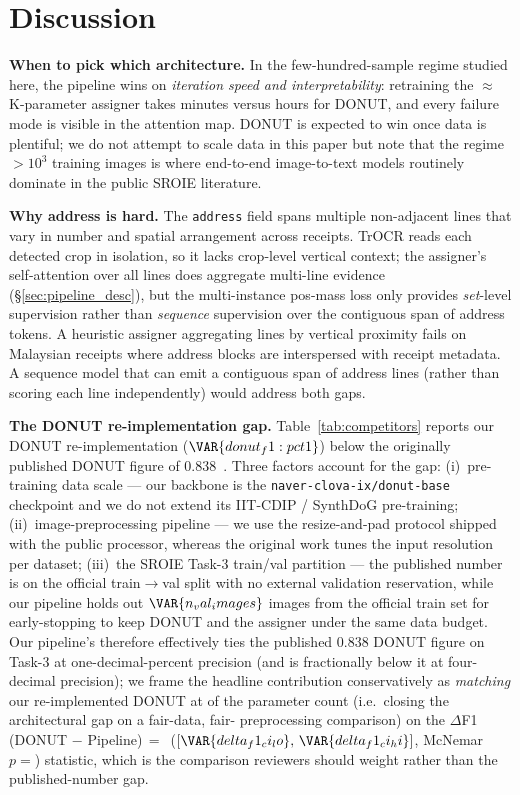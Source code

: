 \section{Discussion}
\label{sec:discussion}

\textbf{When to pick which architecture.}
In the few-hundred-sample regime studied here, the pipeline wins on
\emph{iteration speed and interpretability}: retraining the
$\approx$\,K-parameter assigner takes minutes
versus hours for DONUT, and every failure mode is visible in the
attention map.  DONUT is expected to win once data is plentiful; we
do not attempt to scale data in this paper but note that the regime
$>10^3$ training images is where end-to-end image-to-text models
routinely dominate in the public SROIE literature.

\textbf{Why address is hard.}
The \texttt{address} field spans multiple non-adjacent lines that
vary in number and spatial arrangement across receipts.  TrOCR reads
each detected crop in isolation, so it lacks crop-level vertical
context; the assigner's self-attention over all lines does aggregate
multi-line evidence (\S\ref{sec:pipeline_desc}), but the
multi-instance pos-mass loss only provides \emph{set}-level
supervision rather than \emph{sequence} supervision over the
contiguous span of address tokens.  A heuristic assigner aggregating
lines by vertical proximity fails on Malaysian receipts where address
blocks are interspersed with receipt metadata.  A sequence model that
can emit a contiguous span of address lines (rather than scoring
each line independently) would address both gaps.

\textbf{The DONUT re-implementation gap.}
Table~\ref{tab:competitors} reports our DONUT re-implementation
($\VAR{donut_f1:pct1}$) below the originally published DONUT figure
of $0.838$~\cite{kim2022donut}.  Three factors account for the gap:
(i)~pre-training data scale --- our backbone is the
\texttt{naver-clova-ix/donut-base} checkpoint and we do not extend
its IIT-CDIP / SynthDoG pre-training; (ii)~image-preprocessing
pipeline --- we use the resize-and-pad protocol shipped with the
public processor, whereas the original work tunes the input
resolution per dataset; (iii)~the SROIE Task-3 train/val partition
--- the published number is on the official train$\rightarrow$val
split with no external validation reservation, while our pipeline
holds out $\VAR{n_val_images}$ images from the official train set for early-stopping
to keep DONUT and the assigner under the same data budget.  Our
pipeline's  therefore effectively ties the
published $0.838$ DONUT figure on Task-3 at one-decimal-percent
precision (and is fractionally below it at four-decimal precision);
we frame the headline contribution conservatively as \emph{matching}
our re-implemented DONUT at  of the
parameter count
(i.e.\ closing the architectural gap on a fair-data, fair-
preprocessing comparison) on the
$\Delta$F1 (DONUT $-$ Pipeline)$\,=\,$
($[\VAR{delta_f1_ci_lo},\,\VAR{delta_f1_ci_hi}]$, McNemar
$p=$) statistic, which is the comparison reviewers
should weight rather than the published-number gap.
